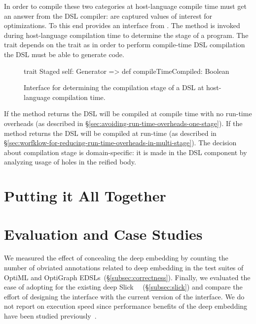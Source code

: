 In order to compile these two categories at host-language compile time \yy must get an
 answer from the DSL compiler: are captured values of interest for optimizations. To this
 end \yy provides an interface  from . The method
  is invoked during host-language compilation time to determine the
 stage of a program. The trait  depends on the trait  as in
 order to perform compile-time DSL compilation the DSL must be able to generate code.

\begin{figure}
\begin{listingtiny}
trait Staged { self: Generator =>
  def compileTimeCompiled: Boolean
}
\end{listingtiny}
\caption{Interface for determining the compilation stage of a DSL at host-language compilation time.}
  \label{fig:staged}
\end{figure}

If the method  returns  the DSL will be compiled at compile time with no run-time overheads (as described in \S \ref{sec:avoiding-run-time-overheads-one-stage}). If the method returns  the DSL will be compiled at run-time (as described in \S \ref{sec:worfklow-for-reducing-run-time-overheads-in-multi-stage}). The decision about compilation stage is domain-specific: it is made in the DSL component by analyzing usage of holes in the reified body.




\chapter{Putting it All Together}
\label{sec:putting-it-all-together}

\chapter{Evaluation and Case Studies}
\label{sec:ch2-evaluation}

We measured the effect of concealing the deep embedding by counting the
number of obviated annotations related to deep embedding in the test suites of OptiML
and OptiGraph EDSLs~(\S \ref{subsec:correctness}). Finally, we evaluated the ease
of adopting \yy for the existing deep \edsl Slick~\cite{slick}
~(\S \ref{subsec:slick}) and compare the effort of designing the interface with
the current version of the interface. We do not report on execution speed since performance
benefits of the deep embedding have been studied previously~\cite{rompf_optimizing_2013,forge}.


